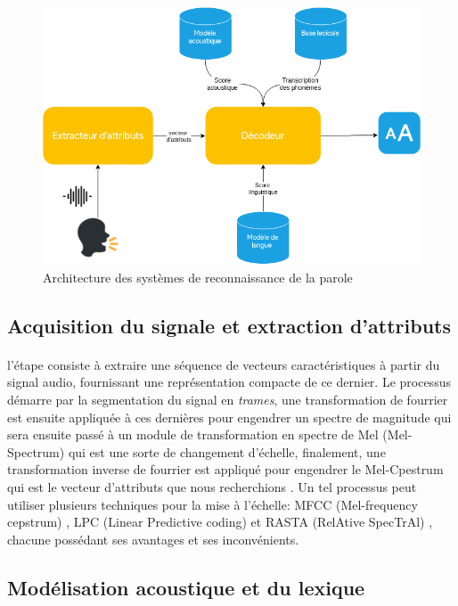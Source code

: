 	\begin{figure}[H]
		\centering
		\label{ASR_schema}
		\includegraphics[width=0.75\linewidth]{images/ASR/schema.png}
		\caption{Architecture des systèmes de reconnaissance de la parole \cite{speech_reco_Yu2015}}
	\end{figure}
	
	\subsection{Acquisition du signale et extraction d'attributs}
		\paragraph{}
		l'étape consiste à extraire une séquence de vecteurs caractéristiques à partir du signal audio, fournissant une représentation compacte de ce dernier. Le processus démarre par la segmentation du signal en \textit{trames}, une transformation de fourrier est ensuite appliquée à ces dernières pour engendrer un spectre de magnitude qui sera ensuite passé à un module de transformation en spectre de Mel (Mel-Spectrum) qui est une sorte de changement d'échelle, finalement, une transformation inverse de fourrier est appliqué pour engendrer le Mel-Cpestrum qui est le vecteur d'attributs que nous recherchions \cite{asr_extraction}. Un tel processus peut utiliser plusieurs techniques pour la mise à l'échelle: MFCC (Mel-frequency cepstrum) \cite{MFCC}, LPC (Linear Predictive coding) \cite{LSP} et RASTA (RelAtive SpecTrAl) \cite{RASTA}, chacune possédant ses avantages et ses inconvénients.
	\subsection{Modélisation acoustique et du lexique}
